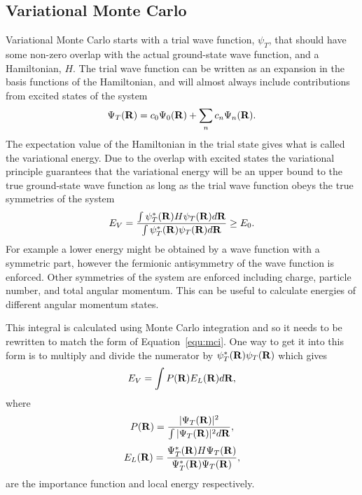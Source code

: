 \subsection{Variational Monte Carlo}
Variational Monte Carlo starts with a trial wave function, $\psi_T$, that should have some non-zero overlap with the actual ground-state wave function, and a Hamiltonian, $H$. The trial wave function can be written as an expansion in the basis functions of the Hamiltonian, and will almost always include contributions from excited states of the system
\begin{equation}
   \Psi_T(\mathbf{R}) = c_0\Psi_0(\mathbf{R}) + \sum\limits_n c_n \Psi_n(\mathbf{R}).
\end{equation}
The expectation value of the Hamiltonian in the trial state gives what is called the variational energy. Due to the overlap with excited states the variational principle guarantees that the variational energy will be an upper bound to the true ground-state wave function as long as the trial wave function obeys the true symmetries of the system
\begin{equation}
   E_V = \frac{\int\psi_T^*(\mathbf{R})H\psi_T(\mathbf{R})d\mathbf{R}}{\int\psi_T^*(\mathbf{R})\psi_T(\mathbf{R})d\mathbf{R}} \ge E_0.
\end{equation}
For example a lower energy might be obtained by a wave function with a symmetric part, however the fermionic antisymmetry of the wave function is enforced. Other symmetries of the system are enforced including charge, particle number, and total angular momentum. This can be useful to calculate energies of different angular momentum states.


This integral is calculated using Monte Carlo integration and so it needs to be rewritten to match the form of Equation~\ref{equ:mci}. One way to get it into this form is to multiply and divide the numerator by $\psi_T^*(\mathbf{R})\psi_T(\mathbf{R})$ which gives
\begin{equation} 
  E_V = \int P(\mathbf{R}) E_L(\mathbf{R}) d\mathbf{R},
\end{equation}
where
\begin{equation}
   P(\mathbf{R}) = \frac{|\Psi_T(\mathbf{R})|^2}{\int|\Psi_T(\mathbf{R})|^2d\mathbf{R}},
\end{equation}
\begin{equation}
   E_L(\R) = \frac{\Psi_T^*(\R)H\Psi_T(\R)}{\Psi_T^*(\R)\Psi_T(\R)},%
\end{equation}
are the importance function and local energy respectively.

